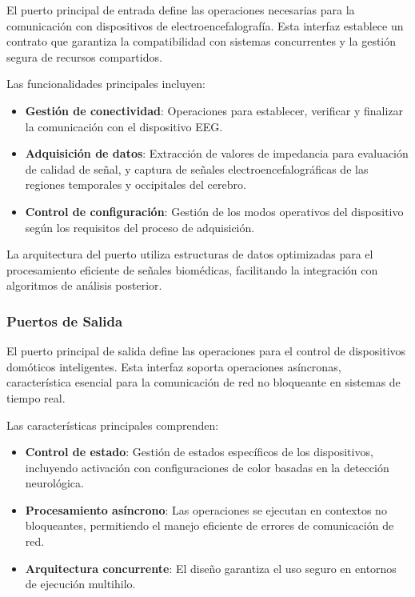 El puerto principal de entrada define las operaciones necesarias para la comunicación con dispositivos de electroencefalografía. Esta interfaz establece un contrato que garantiza la compatibilidad con sistemas concurrentes y la gestión segura de recursos compartidos.

Las funcionalidades principales incluyen:

\begin{itemize}
    \item \textbf{Gestión de conectividad}: Operaciones para establecer, verificar y finalizar la comunicación con el dispositivo EEG.
    \item \textbf{Adquisición de datos}: Extracción de valores de impedancia para evaluación de calidad de señal, y captura de señales electroencefalográficas de las regiones temporales y occipitales del cerebro.
    \item \textbf{Control de configuración}: Gestión de los modos operativos del dispositivo según los requisitos del proceso de adquisición.
\end{itemize}

La arquitectura del puerto utiliza estructuras de datos optimizadas para el procesamiento eficiente de señales biomédicas, facilitando la integración con algoritmos de análisis posterior.

\subsubsection{Puertos de Salida}

El puerto principal de salida define las operaciones para el control de dispositivos domóticos inteligentes. Esta interfaz soporta operaciones asíncronas, característica esencial para la comunicación de red no bloqueante en sistemas de tiempo real.

Las características principales comprenden:

\begin{itemize}
    \item \textbf{Control de estado}: Gestión de estados específicos de los dispositivos, incluyendo activación con configuraciones de color basadas en la detección neurológica.
    \item \textbf{Procesamiento asíncrono}: Las operaciones se ejecutan en contextos no bloqueantes, permitiendo el manejo eficiente de errores de comunicación de red.
    \item \textbf{Arquitectura concurrente}: El diseño garantiza el uso seguro en entornos de ejecución multihilo.
\end{itemize}

